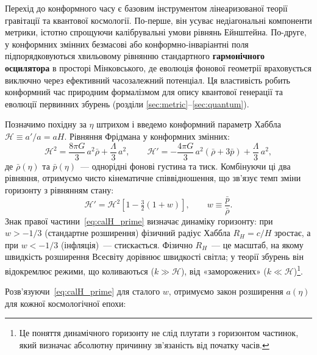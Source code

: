 \documentclass[12pt, a4paper]{article}
\begin{document}
\begin{keybox}
Перехід до конформного часу є базовим інструментом лінеаризованої теорії
гравітації та квантової космології. По-перше, він усуває недіагональні
компоненти метрики, істотно спрощуючи калібрувальні умови рівнянь Ейнштейна.
По-друге, у конформних змінних безмасові або конформно-інваріантні поля
підпорядковуються хвильовому рівнянню стандартного \textbf{гармонічного осцилятора}
в просторі Мінковського, де еволюція фонової геометрії враховується виключно
через ефективний часозалежний потенціал. Ця властивість робить конформний
час природним формалізмом для опису квантової генерації та еволюції
первинних збурень (розділи \ref{sec:metric}–\ref{sec:quantum}).
\end{keybox}

Позначимо похідну за $\eta$ штрихом і введемо конформний
параметр Хаббла $\mathcal{H} \equiv a'/a = aH$. Рівняння
Фрідмана у конформних змінних:
\begin{equation*}
  \mathcal{H}^2 = \frac{8\pi G}{3}\,a^2\bar{\rho}
                + \frac{\Lambda}{3}\,a^2,
  \qquad
  \mathcal{H}' = -\frac{4\pi G}{3}\,a^2(\bar{\rho} + 3\bar{p})
               + \frac{\Lambda}{3}\,a^2,
\end{equation*}
де $\bar{\rho}(\eta)$ та $\bar{p}(\eta)$~--- однорідні фонові
густина та тиск. Комбінуючи ці два рівняння, отримуємо чисто
кінематичне співвідношення, що зв'язує темп зміни горизонту
з рівнянням стану:
\begin{equation}\label{eq:calH_prime}
  \mathcal{H}' = \mathcal{H}^2\!\left[1 - \tfrac{3}{2}(1+w)\right],
  \qquad w \equiv \frac{\bar{p}}{\bar{\rho}}.
\end{equation}
Знак правої частини~\eqref{eq:calH_prime} визначає динаміку
горизонту: при $w > -1/3$ (стандартне розширення) фізичний
радіус Хаббла $R_H = c/H$ зростає, а при $w < -1/3$
(інфляція)~--- стискається. Фізично $R_H$~--- це масштаб,
на якому швидкість розширення Всесвіту дорівнює швидкості
світла; у теорії збурень він відокремлює режими, що
коливаються ($k \gg \mathcal{H}$), від «заморожених»
($k \ll \mathcal{H}$)\footnote{Це поняття динамічного
горизонту не слід плутати з горизонтом частинок, який
визначає абсолютну причинну зв'язаність від початку часів.}.

Розв'язуючи~\eqref{eq:calH_prime} для сталого $w$, отримуємо
закон розширення $a(\eta)$ для кожної космологічної епохи:
\end{document}
